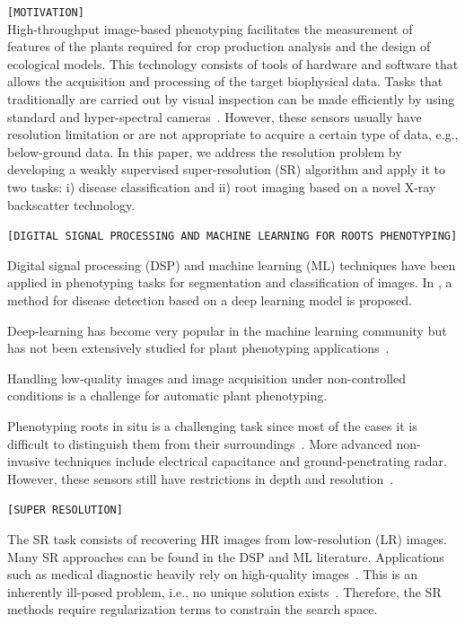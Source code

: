 \documentclass[10pt,twocolumn,letterpaper]{article}
\begin{document}
\texttt{[MOTIVATION]}\\
High-throughput image-based phenotyping facilitates the measurement of features of the plants required for crop production analysis and the design of ecological models. This technology consists of tools of hardware and software that allows the acquisition and processing of the target biophysical data. Tasks that traditionally are carried out by visual inspection can be made efficiently by using standard and hyper-spectral cameras~\cite{Fahlgren2015}. However, these sensors usually have resolution limitation or are not appropriate to acquire a certain type of data, e.g., below-ground data. In this paper, we address the resolution problem by developing a weakly supervised super-resolution (SR) algorithm and apply it to two tasks:  i) disease classification and ii) root imaging based on a novel X-ray backscatter technology.

\texttt{[DIGITAL SIGNAL PROCESSING AND MACHINE LEARNING FOR ROOTS PHENOTYPING]}

Digital signal processing (DSP) and machine learning (ML) techniques have been applied in phenotyping tasks for segmentation and classification of images. In \cite{Ramcharan2017}, a method for disease detection based on a deep learning model is proposed.

Deep-learning has become very popular in the machine learning community but has not been extensively studied for plant phenotyping applications~\cite{Ubbens2017}.

Handling low-quality images and image acquisition under non-controlled conditions is a challenge for automatic plant phenotyping.

Phenotyping roots in situ is a challenging task since most of the cases it is difficult to distinguish them from their surroundings~\cite{Tabb2018}. More advanced non-invasive techniques include electrical capacitance and ground-penetrating radar. However, these sensors still have restrictions in depth and resolution~\cite{Araus2014}.

\texttt{[SUPER RESOLUTION]}

The SR task consists of recovering HR images from low-resolution (LR) images. Many SR approaches can be found in the DSP and ML literature. Applications such as medical diagnostic heavily rely on high-quality images~\cite{Zhang2012}. This is an inherently ill-posed problem, i.e., no unique solution exists~\cite{Hui2018}. Therefore, the SR methods require regularization terms to constrain the search space.
\end{document}
